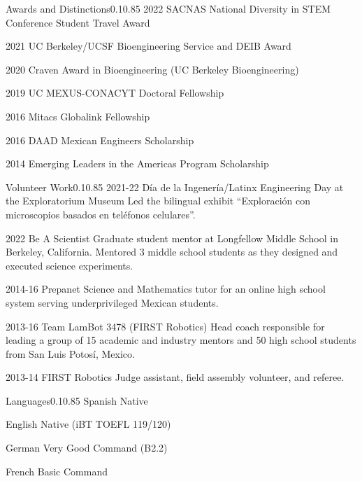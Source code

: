 \documentclass{federico_cv}
\begin{document}
\begin{tblSection}{Awards and Distinctions}{0.1}{0.85}
\award
{2022}
{SACNAS National Diversity in STEM Conference Student Travel Award}

\award
{2021}
{UC Berkeley/UCSF Bioengineering Service and DEIB Award}

\award
{2020}
{Craven Award in Bioengineering (UC Berkeley Bioengineering)}

\award
{2019}
{UC MEXUS-CONACYT Doctoral Fellowship}

\award
{2016}
{Mitacs Globalink Fellowship}

\award
{2016}
{DAAD Mexican Engineers Scholarship}

\award
{2014}
{Emerging Leaders in the Americas Program Scholarship}

\end{tblSection}


\begin{tblSection}{Volunteer Work}{0.1}{0.85}
\job
{2021-22}
{Día de la Ingenería/Latinx Engineering Day at the Exploratorium Museum}
{Led the bilingual exhibit ``Exploración con microscopios basados en teléfonos celulares''.}

\leftbfrightsinglenobreak
{2022}
{Be A Scientist}
{Graduate student mentor at Longfellow Middle School in Berkeley, California. Mentored 3 middle school students as they designed and executed science experiments.}

\job
{2014-16}
{Prepanet}
{Science and Mathematics tutor for an online high school system serving underprivileged Mexican students.}

\job
{2013-16}
{Team LamBot 3478 (FIRST Robotics)}
{Head coach responsible for leading a group of 15 academic and industry mentors and 50 high school students from San Luis Potosí, Mexico.}

\job
{2013-14}
{FIRST Robotics}
{Judge assistant, field assembly volunteer, and referee.}

\end{tblSection}


\begin{tblSection}{Languages}{0.1}{0.85}
\leftrightsingletight
{Spanish}
{Native}

\leftrightsingletight
{English}
{Native (iBT TOEFL 119/120)}

\leftrightsingletight
{German}
{Very Good Command (B2.2)}

\leftrightsingletight
{French}
{Basic Command}

\end{tblSection}
\end{document}
